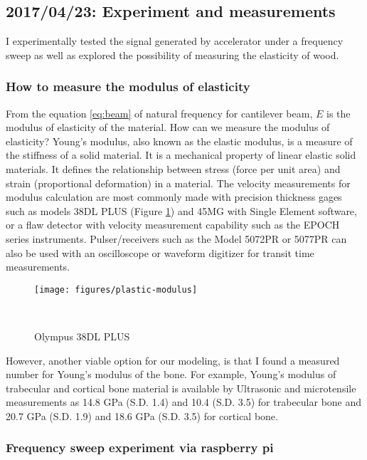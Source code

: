 \documentclass{sigchi}
\begin{document}
\subsection{2017/04/23: Experiment and measurements}

I experimentally tested the signal generated by accelerator under a frequency sweep as well as explored the possibility of measuring the elasticity of wood. 

\subsubsection{How to measure the modulus of elasticity} 

From the equation \eqref{eq:beam} of natural frequency for cantilever beam, $E$ is the modulus of elasticity of the material. How can we measure the modulus of elasticity? Young's modulus, also known as the elastic modulus, is a measure of the stiffness of a solid material. It is a mechanical property of linear elastic solid materials. It defines the relationship between stress (force per unit area) and strain (proportional deformation) in a material. The velocity measurements for modulus calculation are most commonly made with precision thickness gages such as models 38DL PLUS (Figure \ref{fig:plastic-modulus}) and 45MG with Single Element software,  or a flaw detector with velocity measurement capability such as the EPOCH series instruments. Pulser/receivers such as the Model 5072PR or 5077PR can also be used with an oscilloscope or waveform digitizer for transit time measurements. 

\begin{figure}
\centering
  \texttt{[image: figures/plastic-modulus]}
  \caption{Olympus 38DL PLUS}~\label{fig:plastic-modulus}
\end{figure}

However, another viable option for our modeling, is that I found a measured number for Young's modulus of the bone. For example, Young's modulus of trabecular and cortical bone material is available by Ultrasonic and microtensile measurements \cite{boneYoung} as 14.8 GPa (S.D. 1.4) and 10.4 (S.D. 3.5) for trabecular bone and 20.7 GPa (S.D. 1.9) and 18.6 GPa (S.D. 3.5) for cortical bone.

\subsubsection{Frequency sweep experiment via raspberry pi} 
\end{document}
